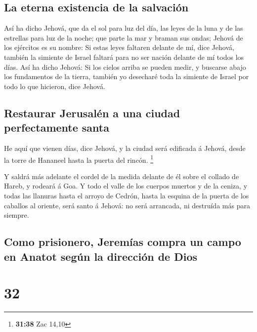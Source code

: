 \hypertarget{la-eterna-existencia-de-la-salvaciuxf3n}{%
\subsection{La eterna existencia de la
salvación}\label{la-eterna-existencia-de-la-salvaciuxf3n}}

 Así ha dicho Jehová, que da el sol para luz del día, las
leyes de la luna y de las estrellas para luz de la noche; que parte la
mar y braman sus ondas; Jehová de los ejércitos es su nombre:
 Si estas leyes faltaren delante de mí, dice Jehová,
también la simiente de Israel faltará para no ser nación delante de mí
todos los días.  Así ha dicho Jehová: Si los cielos arriba
se pueden medir, y buscarse abajo los fundamentos de la tierra, también
yo desecharé toda la simiente de Israel por todo lo que hicieron, dice
Jehová.

\hypertarget{restaurar-jerusaluxe9n-a-una-ciudad-perfectamente-santa}{%
\subsection{Restaurar Jerusalén a una ciudad perfectamente
santa}\label{restaurar-jerusaluxe9n-a-una-ciudad-perfectamente-santa}}

 He aquí que vienen días, dice Jehová, y la ciudad será
edificada á Jehová, desde la torre de Hananeel hasta la puerta del
rincón. \footnote{\textbf{31:38} Zac 14,10}

 Y saldrá más adelante el cordel de la medida delante de él
sobre el collado de Hareb, y rodeará á Goa.  Y todo el
valle de los cuerpos muertos y de la ceniza, y todas las llanuras hasta
el arroyo de Cedrón, hasta la esquina de la puerta de los caballos al
oriente, será santo á Jehová: no será arrancada, ni destruída más para
siempre.

\hypertarget{como-prisionero-jeremuxedas-compra-un-campo-en-anatot-seguxfan-la-direcciuxf3n-de-dios}{%
\subsection{Como prisionero, Jeremías compra un campo en Anatot según la
dirección de
Dios}\label{como-prisionero-jeremuxedas-compra-un-campo-en-anatot-seguxfan-la-direcciuxf3n-de-dios}}

\hypertarget{section-31}{%
\section{32}\label{section-31}}

